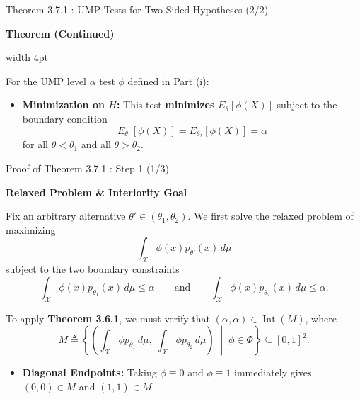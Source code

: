 \documentclass[10pt, aspectratio=169, xcolor=dvipsnames]{beamer}
\newcommand{\lead}[1]{{\color{UniBlue}\bfseries #1}}
\begin{document}
\begin{frame}{Theorem 3.7.1 : UMP Tests for Two-Sided Hypotheses (2/2)}
    
    \lead{Theorem (Continued)}\\
    \vspace{0.2cm}
    
    \noindent
    {\color{Teal}\vrule width 4pt}%
    \hspace{10pt}%
    \begin{minipage}{\dimexpr\textwidth-14pt\relax}
        \color{Slate}
        For the UMP level $\alpha$ test $\phi$ defined in Part (i):
        \vspace{0.2cm}
        \begin{itemize}
            \setlength\itemsep{8pt}
            \item[{\tikz[baseline=(char.base)]{\node[shape=circle,draw=Teal,inner sep=1pt,text=Teal,font=\scriptsize\bfseries] (char) {ii};}}] \lead{Minimization on $H$:} This test \textbf{minimizes} $E_\theta[\phi(X)]$ subject to the boundary condition
            \[
                E_{\theta_1}[\phi(X)] = E_{\theta_2}[\phi(X)] = \alpha
            \]
            for all $\theta < \theta_1$ and all $\theta > \theta_2$.
            
        \end{itemize}
    \end{minipage}
\end{frame}
\begin{frame}{Proof of Theorem 3.7.1 : Step 1 (1/3)}
    
    \lead{Relaxed Problem \& Interiority Goal}\\
    \vspace{0.2cm}
    
    \color{Slate}
    Fix an arbitrary alternative $\theta' \in (\theta_1, \theta_2)$. We first solve the relaxed problem of maximizing
    \[
        \int_{\mathcal{X}} \phi(x) p_{\theta'}(x)\, d\mu
    \]
    subject to the two boundary constraints
    \[
        \int_{\mathcal{X}} \phi(x) p_{\theta_1}(x)\, d\mu \le \alpha
        \qquad \text{and} \qquad
        \int_{\mathcal{X}} \phi(x) p_{\theta_2}(x)\, d\mu \le \alpha.
    \]
    
    \vspace{0.15cm}
    To apply \textbf{Theorem 3.6.1}, we must verify that $(\alpha, \alpha) \in \operatorname{Int}(M)$, where
    \[
        M \triangleq \left\{ \left(\int_{\mathcal{X}} \phi p_{\theta_1}\, d\mu,\; \int_{\mathcal{X}} \phi p_{\theta_2}\, d\mu\right) \;\middle|\; \phi \in \Phi \right\} \subseteq [0,1]^2.
    \]
    \begin{itemize}
        \item[\textcolor{Teal}{\textbullet}] \textbf{Diagonal Endpoints:} Taking $\phi \equiv 0$ and $\phi \equiv 1$ immediately gives $(0,0) \in M$ and $(1,1) \in M$.
    \end{itemize}
\end{frame}
\end{document}
